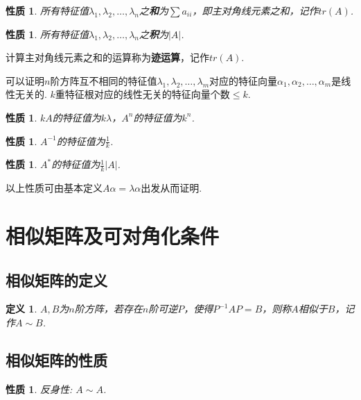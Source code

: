 \documentclass[12pt, a4paper, oneside]{ctexbook}
\newtheorem{definition}[theorem]{定义}
\newtheorem{quolity}[theorem]{性质}
\begin{document}
\begin{quolity}
    所有特征值$\lambda_1, \lambda_2, \dots, \lambda_n$之\textbf{和}为$\sum a_{ii}$，即主对角线元素之和，记作$tr(A)$. 
\end{quolity}

\begin{quolity}
    所有特征值$\lambda_1, \lambda_2, \dots, \lambda_n$之\textbf{积}为$\left | A \right |$. 
\end{quolity}

计算主对角线元素之和的运算称为\textbf{迹运算}，记作$tr(A)$. 


可以证明$n$阶方阵互不相同的特征值$\lambda_1, \lambda_2, \dots, \lambda_m$对应的特征向量$\alpha_1, \alpha_2, \dots, \alpha_m$是线性无关的. 
$k$重特征根对应的线性无关的特征向量个数$\le k$. 

\begin{quolity}
    $kA$的特征值为$k \lambda$，$A^n$的特征值为$k^n$. 
\end{quolity}

\begin{quolity}
    $A^{-1}$的特征值为$\frac{1}{k}$. 
\end{quolity}

\begin{quolity}
    $A^*$的特征值为$\frac{1}{k} \left | A \right |$. 
\end{quolity}

以上性质可由基本定义$A \alpha = \lambda \alpha$出发从而证明. 

\section{相似矩阵及可对角化条件}

\subsection{相似矩阵的定义}

\begin{definition}
    $A,B$为$n$阶方阵，若存在$n$阶可逆$P$，使得$P^{-1}AP=B$，则称$A$相似于$B$，记作$A \sim B$. 
\end{definition}

\subsection{相似矩阵的性质}

\begin{quolity}
    反身性: $A \sim A$. 
\end{quolity}
\end{document}
